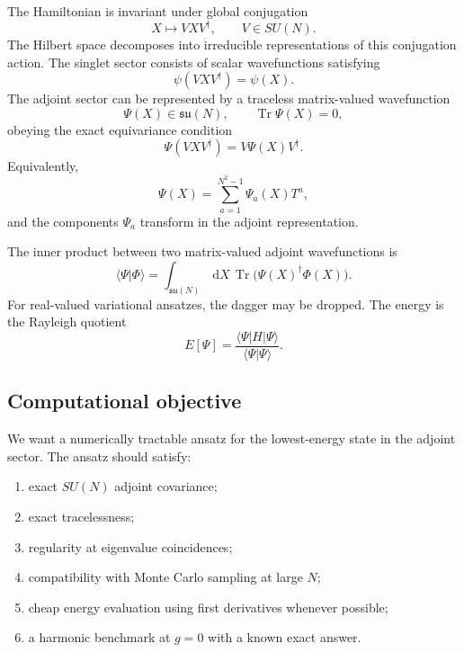 \documentclass[11pt]{article}
\newcommand{\Tr}{\operatorname{Tr}}
\newcommand{\su}{\mathfrak{su}}
\newcommand{\dd}{\,\mathrm d}
\begin{document}
The Hamiltonian is invariant under global conjugation
\begin{equation}
X\mapsto VXV^\dagger,
\qquad V\in SU(N).
\end{equation}
The Hilbert space decomposes into irreducible representations of this conjugation action.  The singlet sector consists of scalar wavefunctions satisfying
\begin{equation}
\psi(VXV^\dagger)=\psi(X).
\end{equation}
The adjoint sector can be represented by a traceless matrix-valued wavefunction
\begin{equation}
\Psi(X)\in \su(N),
\qquad \Tr\Psi(X)=0,
\end{equation}
obeying the exact equivariance condition
\begin{equation}
\boxed{
\Psi(VXV^\dagger)=V\Psi(X)V^\dagger.
}
\label{eq:equivariance}
\end{equation}
Equivalently,
\begin{equation}
\Psi(X)=\sum_{a=1}^{N^2-1}\Psi_a(X)T^a,
\end{equation}
and the components $\Psi_a$ transform in the adjoint representation.

The inner product between two matrix-valued adjoint wavefunctions is
\begin{equation}
\langle \Psi|\Phi\rangle
=\int_{\su(N)}\dd X\,\Tr\bigl(\Psi(X)^\dagger\Phi(X)\bigr).
\end{equation}
For real-valued variational ansatzes, the dagger may be dropped.  The energy is the Rayleigh quotient
\begin{equation}
E[\Psi]
=\frac{\langle \Psi|H|\Psi\rangle}{\langle\Psi|\Psi\rangle}.
\end{equation}

\subsection{Computational objective}

We want a numerically tractable ansatz for the lowest-energy state in the adjoint sector.  The ansatz should satisfy:
\begin{enumerate}[label=(\roman*)]
\item exact $SU(N)$ adjoint covariance;
\item exact tracelessness;
\item regularity at eigenvalue coincidences;
\item compatibility with Monte Carlo sampling at large $N$;
\item cheap energy evaluation using first derivatives whenever possible;
\item a harmonic benchmark at $g=0$ with a known exact answer.
\end{enumerate}
\end{document}
